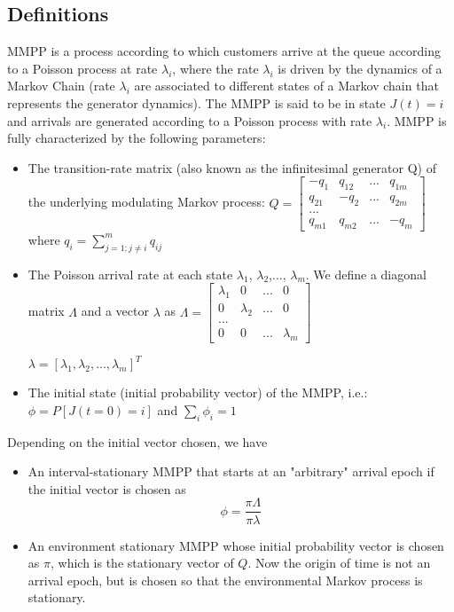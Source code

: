 \documentclass[a4paper]{article}
\begin{document}
\subsection{Definitions}
MMPP is a process according to which customers arrive at the queue according to a Poisson process at rate $\lambda_i$, where the rate $\lambda_i$ is driven by the dynamics of a  Markov Chain (rate $\lambda_i$ are associated to different states of a Markov chain that represents the generator dynamics).
The MMPP is said to be in state $J(t) = i$ and arrivals are generated according to a Poisson process with rate $\lambda_i$.
MMPP  is  fully characterized by the following parameters:
\begin{itemize}
	\item  The transition-rate matrix (also known as the infinitesimal generator Q) of the underlying modulating Markov process: 
	  $Q = \begin{bmatrix}
  -q_1 & q_{12} & ... & q_{1m}\\
  q_{21} & -q_{2} & ... & q_{2m}\\
   ... &  &  & \\
  q_{m1} & q_{m2} & ... & -q_m
 \end{bmatrix} $
 where $q_i = \displaystyle\sum_{j = 1;j \neq i}^{m} q_{ij}$
 \item The Poisson arrival rate at each state $\lambda_1$, $\lambda_2$,..., $\lambda_m$. We define a diagonal matrix $\Lambda$  and a vector $\lambda$ as
   $\Lambda = \begin{bmatrix}
  \lambda_1 & 0 & ... & 0\\
  0 & \lambda_2 & ... & 0\\
   ... &  &  & \\
  0 & 0 & ... & \lambda_m
 \end{bmatrix} $
 
 $\lambda = [\lambda_1, \lambda_2,..., \lambda_m]^T$
 \item The initial state (initial probability vector) of the MMPP, i.e.: 
 $\phi = P[J(t=0) = i]$ and $\displaystyle\sum_{i}{\phi_i} = 1$
 
\end{itemize}
Depending on the initial vector chosen, we have
\begin{itemize}
	\item An interval-stationary MMPP that starts at an "arbitrary" arrival epoch if the initial vector is chosen as
$$\phi = \frac{\pi\Lambda}{\pi\lambda}$$
  \item  An environment stationary MMPP whose initial probability vector is chosen as $\pi$, which is the stationary vector of $Q$. Now the origin of time is not an arrival epoch, but is chosen so that the environmental Markov process is stationary.
\end{itemize}
\end{document}
